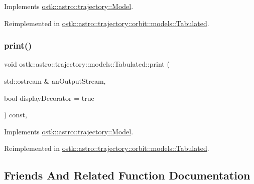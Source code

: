 Implements \hyperlink{classostk_1_1astro_1_1trajectory_1_1_model_a874f79846e845859c070ce1b9874fc9c}{ostk\+::astro\+::trajectory\+::\+Model}.



Reimplemented in \hyperlink{classostk_1_1astro_1_1trajectory_1_1orbit_1_1models_1_1_tabulated_abd72010cb413d8479c097376bfebaf56}{ostk\+::astro\+::trajectory\+::orbit\+::models\+::\+Tabulated}.

\mbox{\label{classostk_1_1astro_1_1trajectory_1_1models_1_1_tabulated_a330bfffa50eb77eb7f6d45cfec1e9e29}} 
\subsubsection{\texorpdfstring{print()}{print()}}
{\footnotesize\ttfamily void ostk\+::astro\+::trajectory\+::models\+::\+Tabulated\+::print (\begin{DoxyParamCaption}\item[{std\+::ostream \&}]{an\+Output\+Stream,  }\item[{bool}]{display\+Decorator = {\ttfamily true} }\end{DoxyParamCaption}) const\hspace{0.3cm}{\ttfamily [override]}, {\ttfamily [virtual]}}



Implements \hyperlink{classostk_1_1astro_1_1trajectory_1_1_model_a4b2098483430a820481ed50b81656e31}{ostk\+::astro\+::trajectory\+::\+Model}.



Reimplemented in \hyperlink{classostk_1_1astro_1_1trajectory_1_1orbit_1_1models_1_1_tabulated_a66be3f1f23a464c666c38a3adcc3bab5}{ostk\+::astro\+::trajectory\+::orbit\+::models\+::\+Tabulated}.



\subsection{Friends And Related Function Documentation}
\mbox{\label{classostk_1_1astro_1_1trajectory_1_1models_1_1_tabulated_af2b779226be02822defbe40cf6d3c4b8}} 
